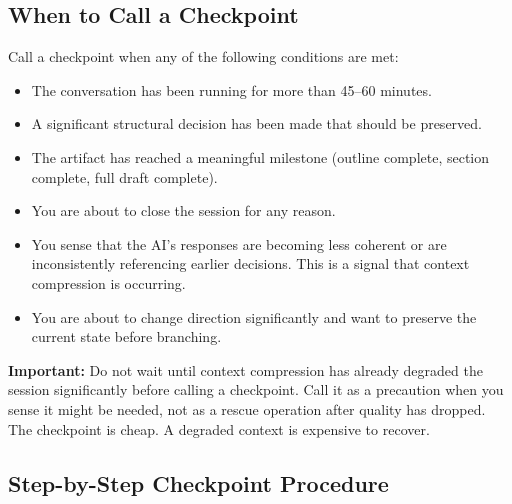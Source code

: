 \documentclass[12pt,letterpaper]{article}
\begin{document}
\subsection{When to Call a Checkpoint}

Call a checkpoint when any of the following conditions are met:

\begin{itemize}
  \item The conversation has been running for more than 45--60 minutes.
  \item A significant structural decision has been made that should be preserved.
  \item The artifact has reached a meaningful milestone (outline complete,
        section complete, full draft complete).
  \item You are about to close the session for any reason.
  \item You sense that the AI's responses are becoming less coherent or
        are inconsistently referencing earlier decisions. This is a signal
        that context compression is occurring.
  \item You are about to change direction significantly and want to preserve
        the current state before branching.
\end{itemize}

\begin{mdframed}[style=warnbox]
\textbf{Important:} Do not wait until context compression has already degraded
the session significantly before calling a checkpoint. Call it as a precaution
when you sense it might be needed, not as a rescue operation after quality
has dropped. The checkpoint is cheap. A degraded context is expensive to recover.
\end{mdframed}

\subsection{Step-by-Step Checkpoint Procedure}
\end{document}
